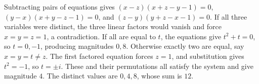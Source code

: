 Subtracting pairs of equations gives $(x-z)(x+z-y-1)=0$, $(y-x)(x+y-z-1)=0$, and $(z-y)(y+z-x-1)=0$. If all three variables were distinct, the three linear factors would vanish and force $x=y=z=1$, a contradiction. If all are equal to $t$, the equations give $t^2+t=0$, so $t=0,-1$, producing magnitudes $0,8$. Otherwise exactly two are equal, say $x=y=t\ne z$. The first factored equation forces $z=1$, and substitution gives $t^2=-1$, so $t=\pm i$. These and their permutations all satisfy the system and give magnitude $4$. The distinct values are $0,4,8$, whose sum is $\boxed{12}$.
